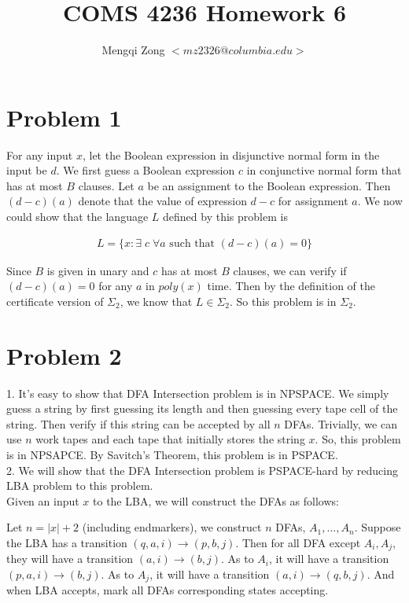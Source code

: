 \documentclass[12pt]{article}
\title{COMS 4236 Homework 6}
\author{Mengqi Zong $<mz2326@columbia.edu>$}
\begin{document}
\maketitle

\setlength{\parindent}{0in}

\section*{Problem 1}

For any input $x$, let the Boolean expression in disjunctive normal
form in the input be $d$. We first guess a Boolean expression $c$ in
conjunctive normal form that has at most $B$ clauses. Let $a$ be an
assignment to the Boolean expression. Then $(d - c)(a)$ denote that
the value of expression $d - c$ for assignment $a$. We now could show
that the language $L$ defined by this problem is

\begin{eqnarray*}
L = \{ x: \exists \; c \; \forall a \text { such that } (d - c)(a) = 0
\}
\end{eqnarray*}

Since $B$ is given in unary and $c$ has at most $B$ clauses, we can
verify if $(d - c)(a) = 0$ for any $a$ in $poly(x)$ time. Then by the
definition of the certificate version of $\Sigma_2$, we know that $L
\in \Sigma_2$. So this problem is in $\Sigma_2$.

\section*{Problem 2}

1. It's easy to show that DFA Intersection problem is in NPSPACE. We
simply guess a string by first guessing its length and then guessing
every tape cell of the string. Then verify if this string can be
accepted by all $n$ DFAs. Trivially, we can use $n$ work tapes and
each tape that initially stores the string $x$. So, this problem is in
NPSAPCE. By Savitch's Theorem, this problem is in PSPACE. \\

2. We will show that the DFA Intersection problem is PSPACE-hard
by reducing LBA problem to this problem. \\

Given an input $x$ to the LBA, we will construct the DFAs as follows:

Let $n = |x| + 2$ (including endmarkers), we construct $n$ DFAs,
$A_1,...,A_n$. Suppose the LBA has a transition $(q, a, i) \rightarrow
(p, b, j)$. Then for all DFA except $A_i, A_j$, they will have a
transition $(a, i) \rightarrow (b, j)$. As to $A_i$, it will have a
transition $(p, a, i) \rightarrow (b, j)$. As to $A_j$, it will have a
transition $(a, i) \rightarrow (q, b, j)$. And when LBA accepts, mark
all DFAs corresponding states accepting. \\
\end{document}
